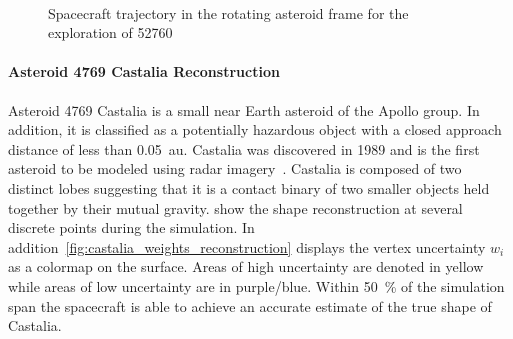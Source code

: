 \documentclass[letterpaper, paper,11pt]{AAS}		%
\begin{document}
\begin{figure}[htbp]
    \centering
    \\%
    \caption{Spacecraft trajectory in the rotating asteroid frame for the exploration of 52760~\label{fig:52760_trajectory}}
\end{figure}

\paragraph{Asteroid 4769 Castalia Reconstruction}

Asteroid 4769 Castalia is a small near Earth asteroid of the Apollo group.
In addition, it is classified as a potentially hazardous object with a closed approach distance of less than \SI{0.05}{\astronomicalunit}.
Castalia was discovered in \num{1989} and is the first asteroid to be modeled using radar imagery~\cite{hudson1994}.
Castalia is composed of two distinct lobes suggesting that it is a contact binary of two smaller objects held together by their mutual gravity.
 show the shape reconstruction at several discrete points during the simulation.
In addition~\cref{fig:castalia_weights_reconstruction} displays the vertex uncertainty \( w_i \) as a colormap on the surface. 
Areas of high uncertainty are denoted in yellow while areas of low uncertainty are in purple/blue.
Within \SI{50}{\percent} of the simulation span the spacecraft is able to achieve an accurate estimate of the true shape of Castalia.
\end{document}
